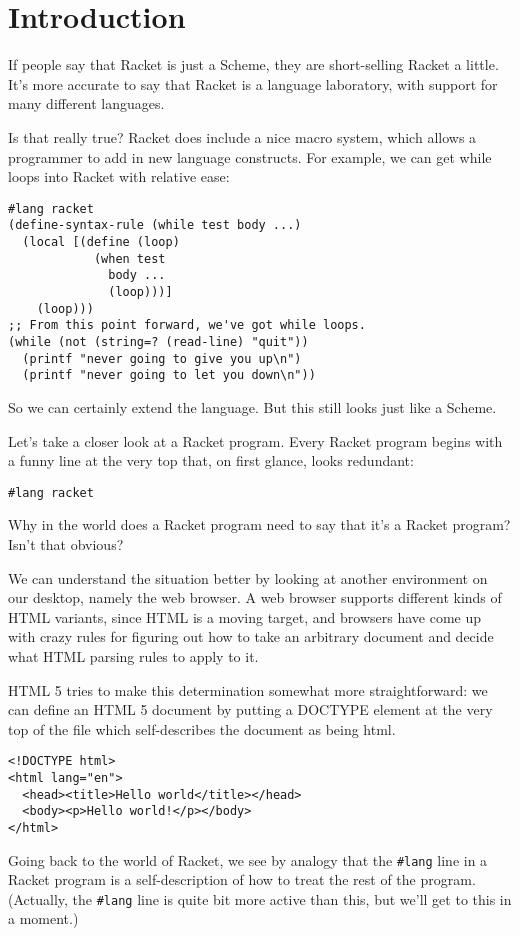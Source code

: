 \documentclass{article}
\begin{document}
\section{Introduction}

If people say that Racket is just a Scheme, they are short-selling Racket a little. It's more accurate to say that Racket is a language laboratory, with support for many different languages.

Is that really true? Racket does include a nice macro system, which allows a programmer to add in new language constructs. For example, we can get while loops into Racket with relative ease:
\begin{verbatim}
#lang racket
(define-syntax-rule (while test body ...)
  (local [(define (loop)
            (when test
              body ...
              (loop)))]
    (loop)))
;; From this point forward, we've got while loops.
(while (not (string=? (read-line) "quit"))
  (printf "never going to give you up\n")
  (printf "never going to let you down\n"))
\end{verbatim}
So we can certainly extend the language. But this still looks just like a Scheme.

Let's take a closer look at a Racket program. Every Racket program begins with a funny line at the very top that, on first glance, looks redundant:
\begin{verbatim}
#lang racket
\end{verbatim}
Why in the world does a Racket program need to say that it's a Racket program? Isn't that obvious?


We can understand the situation better by looking at another environment on our desktop, namely the web browser. A web browser supports different kinds of HTML variants, since HTML is a moving target, and browsers have come up with crazy rules for figuring out how to take an arbitrary document and decide what HTML parsing rules to apply to it.

HTML 5 tries to make this determination somewhat more straightforward: we can define an HTML 5 document by putting a DOCTYPE element at the very top of the file which self-describes the document as being html.
\begin{verbatim}
<!DOCTYPE html>
<html lang="en">
  <head><title>Hello world</title></head>
  <body><p>Hello world!</p></body>
</html>
\end{verbatim}

Going back to the world of Racket, we see by analogy that the \verb+#lang+ line in a Racket program is a self-description of how to treat the rest of the program. (Actually, the \verb+#lang+ line is quite bit more active than this, but we'll get to this in a moment.)
\end{document}
